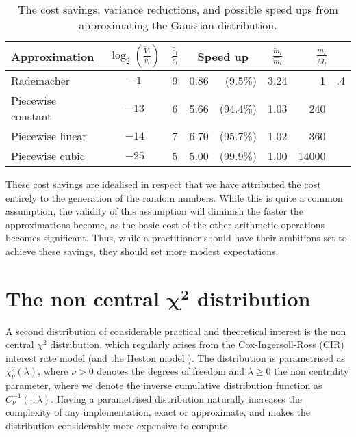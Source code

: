 \documentclass[manuscript,review]{acmart}
\begin{document}
\begin{table}[htb]
\caption{The cost savings, variance reductions, and possible speed ups from approximating the Gaussian distribution.}
\label{tab:savings}
\begin{tabular}{lcclrcr@{}l}
Approximation  & $ {\log}_2 \left(\tfrac{\tilde{V}_l}{\hat{v}_l}\right) $ & $ \tfrac{\hat{c}_l}{\tilde{c}_l} $ & \multicolumn{2}{c}{Speed up} & $ \tfrac{\tilde{m}_l}{\hat{m}_l} $ & \multicolumn{2}{c}{$ \tfrac{\tilde{m}_l}{\tilde{M}_l} $} \\[0.5em]
\hline
Rademacher & $ -1 $ & 9 & 0.86 & (9.5\%) & 3.24 & 1&.4 \\
Piecewise constant & $ -13 $ & 6 & 5.66 & (94.4\%) & 1.03 & 240& \\
Piecewise linear  & $ -14 $ & 7& 6.70 & (95.7\%) & 1.02 & 360 &\\
Piecewise cubic  & $ -25 $ & 5 & 5.00 & (99.9\%)& 1.00 & 14000 & 
\end{tabular}
\end{table}

These cost savings are idealised in respect that we have attributed the cost entirely to the generation of the random numbers. While this is quite a common assumption, the validity of this assumption will diminish the faster the approximations become, as the basic cost of the other arithmetic operations becomes significant. Thus, while a practitioner should have their ambitions set to achieve these savings, they should set more modest expectations.

\section{The non central \texorpdfstring{$ \bm{\chi^2} $}{chi-squared} distribution}
\label{sec:the_non_central_chi_squared_distribution}

A second distribution of considerable practical and theoretical interest is the non central $ \chi^2 $ distribution, which regularly arises from the Cox-Ingersoll-Ross (CIR) interest rate model \citep{cox1985theory} (and the Heston model \citep{heston1993closed}). The distribution is parametrised as $ \chi^2_\nu(\lambda) $, where $ \nu > 0 $ denotes the degrees of freedom and $ \lambda \geq 0 $ the non centrality parameter, where we denote the inverse cumulative distribution function as $ C^{-1}_\nu(\cdot; \lambda) $. Having a parametrised distribution naturally increases the complexity of any implementation, exact or approximate, and makes the distribution considerably more expensive to compute. 
\end{document}
